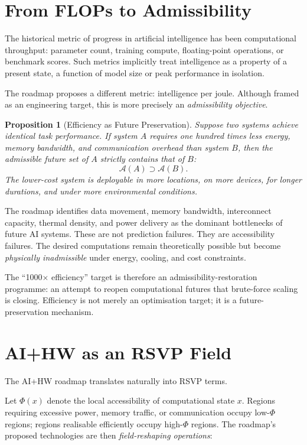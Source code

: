 \documentclass[11pt, a4paper, openany]{book}
\theoremstyle{plain}
\newtheorem{proposition}[theorem]{Proposition}
\theoremstyle{definition}
\theoremstyle{remark}
\begin{document}
\section{From FLOPs to Admissibility}

The historical metric of progress in artificial intelligence has been
computational throughput: parameter count, training compute, floating-point
operations, or benchmark scores.
Such metrics implicitly treat intelligence as a property of a present state,
a function of model size or peak performance in isolation.

The roadmap proposes a different metric: intelligence per joule.
Although framed as an engineering target, this is more precisely an
\emph{admissibility objective}.

\begin{proposition}[Efficiency as Future Preservation]
  Suppose two systems achieve identical task performance.
  If system $A$ requires one hundred times less energy, memory bandwidth,
  and communication overhead than system $B$, then the admissible future
  set of $A$ strictly contains that of $B$:
  \[
    \mathcal{A}(A) \supset \mathcal{A}(B).
  \]
  The lower-cost system is deployable in more locations, on more devices,
  for longer durations, and under more environmental conditions.
\end{proposition}

The roadmap identifies data movement, memory bandwidth, interconnect capacity,
thermal density, and power delivery as the dominant bottlenecks of future
AI systems.
These are not prediction failures.
They are accessibility failures.
The desired computations remain theoretically possible but become
\emph{physically inadmissible} under energy, cooling, and cost constraints.

The ``1000$\times$ efficiency'' target is therefore an
admissibility-restoration programme: an attempt to reopen computational
futures that brute-force scaling is closing.
Efficiency is not merely an optimisation target; it is a future-preservation
mechanism.

\section{AI+HW as an RSVP Field}

The AI+HW roadmap translates naturally into RSVP terms.

Let $\Phi(x)$ denote the local accessibility of computational state $x$.
Regions requiring excessive power, memory traffic, or communication
occupy low-$\Phi$ regions; regions realisable efficiently occupy
high-$\Phi$ regions.
The roadmap's proposed technologies are then \emph{field-reshaping operations}:
\end{document}
